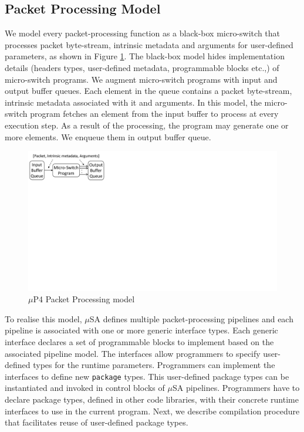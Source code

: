 \documentclass{hotnets19}
\begin{document}
\subsection*{Packet Processing Model}
\label{subsection:packet-processing-using-mp4}
We model every packet-processing function as a black-box micro-switch that processes packet byte-stream, intrinsic metadata and arguments for user-defined parameters, as shown in Figure \ref{fig:mp4-packet-processing-model}.
The black-box model hides implementation details (headers types, user-defined metadata, programmable blocks etc.,) of micro-switch programs.
We augment micro-switch programs with input and output buffer queues.
Each element in the queue contains a packet byte-stream, intrinsic metadata associated with it and arguments.
In this model, the micro-switch program fetches an element from the input buffer to process at every execution step.
As a result of the processing, the program may generate one or more elements.
We enqueue them in output buffer queue.
\begin{figure}
    \centering
    \includegraphics[trim=0 420 667 0, clip, scale=0.5]{microp4-program-model}
    \caption{$\mu$P4 Packet Processing model}
    \label{fig:mp4-packet-processing-model}
\end{figure}

To realise this model, $\mu$SA defines multiple packet-pro\-cessing pipelines and each pipeline is associated with one or more generic interface types.
Each generic interface declares a set of programmable blocks to implement based on the associated pipeline model.
The interfaces allow programmers to specify user-defined types for the runtime parameters.
Programmers can implement the interfaces to define new \texttt{package} types.
This user-defined package types can be instantiated and invoked in control blocks of $\mu$SA pipelines.
Programmers have to declare package types, defined in other code libraries, with their concrete runtime interfaces to use in the current program.
Next, we describe compilation procedure that facilitates reuse of user-defined package types.
\end{document}
